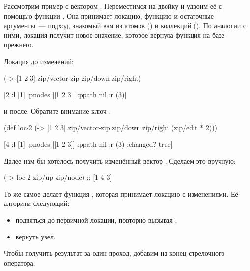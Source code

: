 Рассмотрим пример с вектором \code{[1 2 3]}. Переместимся на двойку и удвоим её с
помощью функции . Она принимает локацию, функцию и остаточные
аргументы~--- подход, знакомый вам из атомов () и коллекций (). По
аналогии с ними, локация получит новое значение, которое вернула функция на базе
прежнего.

Локация до изменений:

\begin{english}
  \begin{clojure}
(-> [1 2 3]
    zip/vector-zip
    zip/down
    zip/right)

[2 {:l [1] :pnodes [[1 2 3]] :ppath nil :r (3)}]
  \end{clojure}
\end{english}

\noindent
и после. Обратите внимание ключ :

\begin{english}
  \begin{clojure}
(def loc-2
  (-> [1 2 3]
      zip/vector-zip
      zip/down
      zip/right
      (zip/edit * 2)))

[4 {:l [1] :pnodes [[1 2 3]] :ppath nil :r (3)
    :changed? true}]
  \end{clojure}
\end{english}

Далее нам бы хотелось получить изменённый вектор \code{[1 4 3]}. Сделаем это вручную:

\begin{english}
  \begin{clojure}
(-> loc-2
    zip/up
    zip/node)
;; [1 4 3]
  \end{clojure}
\end{english}

То же самое делает функция , которая принимает локацию с
изменениями. Её алгоритм следующий:

\begin{itemize}

\item
  подняться до первичной локации, повторно вызывая ;

\item
  вернуть узел.

\end{itemize}

Чтобы получить результат за один проход, добавим  на конец стрелочного
оператора:

